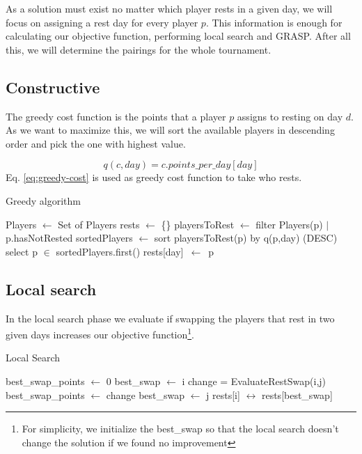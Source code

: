 \documentclass[a4paper, 10pt]{article}
\begin{document}
As a solution must exist no matter which player rests in a given day, we will focus on assigning a rest day for every player $p$. This information is enough for calculating our objective function, performing local search and GRASP. After all this, we will determine the pairings for the whole tournament.

\subsection{Constructive}

The greedy cost function is the points that a player $p$ assigns to resting on day $d$. As we want to maximize this, we will sort the available players in descending order and pick the one with highest value.

\begin{equation}
  \label{eq:greedy-cost}
  q(c,day)= c.points\_per\_day[day]
\end{equation}
Eq. \ref{eq:greedy-cost} is used as greedy cost function to take who rests.

\begin{algorithm}
	\caption{Greedy algorithm} 
	\begin{algorithmic}[1]
	  \State Players $\leftarrow$ Set of Players
	  \State rests $\leftarrow$ \{\}
	      \State playersToRest $\leftarrow$ filter Players(p) $|$ p.hasNotRested
        \State sortedPlayers $\leftarrow$ sort playersToRest(p) by q(p,day) (DESC) 
        \State select p $\in$ sortedPlayers.first()
	      \State rests[day]\ $\leftarrow$\ p
	    \EndFor
	\end{algorithmic} 
\end{algorithm}


\subsection{Local search}

In the local search phase we evaluate if swapping the players that rest in two given days increases our objective function\footnote{For simplicity, we initialize the best\_swap so that the local search doesn't change the solution if we found no improvement}.

\begin{algorithm}
	\caption{Local Search} 
	\begin{algorithmic}[1]
    \State best\_swap\_points $\leftarrow$ 0
    \State best\_swap $\leftarrow$ i
        \State change = EvaluateRestSwap(i,j)
          \State best\_swap\_points $\leftarrow$ change
          \State best\_swap $\leftarrow$ j
        \EndIf
      \EndFor
      \State rests[i] $\leftrightarrow$ rests[best\_swap]
		\EndFor
	\end{algorithmic} 
\end{algorithm}
\end{document}
